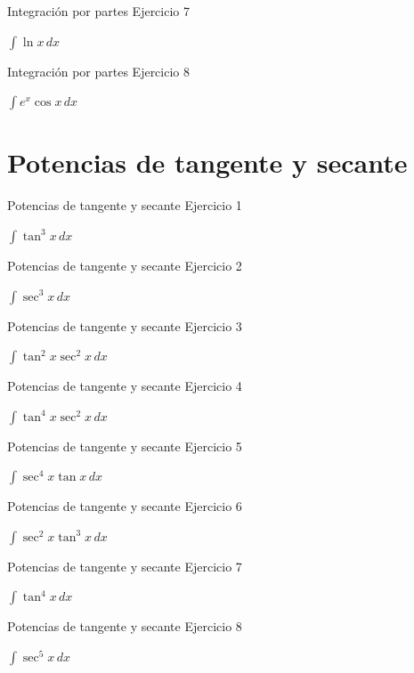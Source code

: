 \documentclass[10pt,aspectratio=169]{beamer}
\newcommand{\ejercicio}[1]{%
  \begin{center}
  \vfill
  {\fontsize{24}{30}\selectfont #1}
  \vfill
  \end{center}
}
\begin{document}
\begin{frame}{Integración por partes}
\small Ejercicio 7
\ejercicio{$\displaystyle \int \ln x\,dx$}
\end{frame}

\begin{frame}{Integración por partes}
\small Ejercicio 8
\ejercicio{$\displaystyle \int e^x\cos x\,dx$}
\end{frame}

\section{Potencias de tangente y secante}

\begin{frame}{Potencias de tangente y secante}
\small Ejercicio 1
\ejercicio{$\displaystyle \int \tan^3x\,dx$}
\end{frame}

\begin{frame}{Potencias de tangente y secante}
\small Ejercicio 2
\ejercicio{$\displaystyle \int \sec^3x\,dx$}
\end{frame}

\begin{frame}{Potencias de tangente y secante}
\small Ejercicio 3
\ejercicio{$\displaystyle \int \tan^2x\sec^2x\,dx$}
\end{frame}

\begin{frame}{Potencias de tangente y secante}
\small Ejercicio 4
\ejercicio{$\displaystyle \int \tan^4x\sec^2x\,dx$}
\end{frame}

\begin{frame}{Potencias de tangente y secante}
\small Ejercicio 5
\ejercicio{$\displaystyle \int \sec^4x\tan x\,dx$}
\end{frame}

\begin{frame}{Potencias de tangente y secante}
\small Ejercicio 6
\ejercicio{$\displaystyle \int \sec^2x\tan^3x\,dx$}
\end{frame}

\begin{frame}{Potencias de tangente y secante}
\small Ejercicio 7
\ejercicio{$\displaystyle \int \tan^4x\,dx$}
\end{frame}

\begin{frame}{Potencias de tangente y secante}
\small Ejercicio 8
\ejercicio{$\displaystyle \int \sec^5x\,dx$}
\end{frame}
\end{document}
